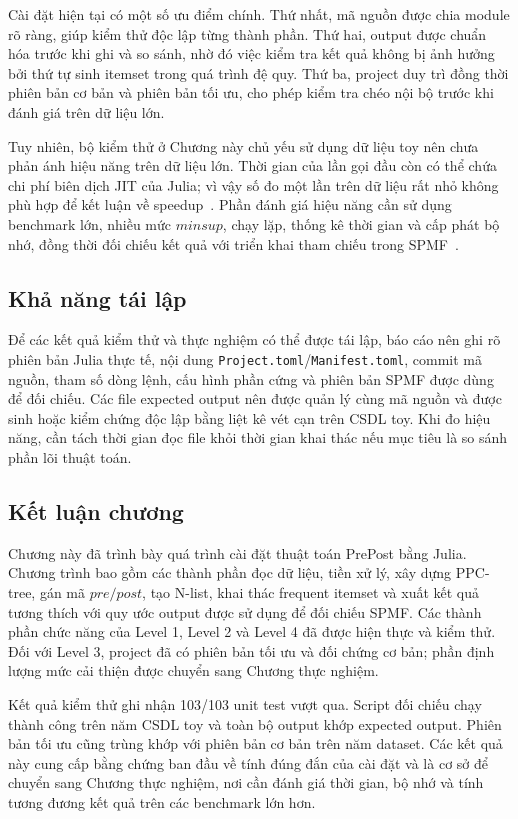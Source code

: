 Cài đặt hiện tại có một số ưu điểm chính. Thứ nhất, mã nguồn được chia module rõ ràng, giúp kiểm thử độc lập từng thành phần. Thứ hai, output được chuẩn hóa trước khi ghi và so sánh, nhờ đó việc kiểm tra kết quả không bị ảnh hưởng bởi thứ tự sinh itemset trong quá trình đệ quy. Thứ ba, project duy trì đồng thời phiên bản cơ bản và phiên bản tối ưu, cho phép kiểm tra chéo nội bộ trước khi đánh giá trên dữ liệu lớn.

Tuy nhiên, bộ kiểm thử ở Chương này chủ yếu sử dụng dữ liệu toy nên chưa
phản ánh hiệu năng trên dữ liệu lớn. Thời gian của lần gọi đầu còn có thể chứa
chi phí biên dịch JIT của Julia; vì vậy số đo một lần trên dữ liệu rất nhỏ không
phù hợp để kết luận về speedup~\cite{bezanson2017julia}. Phần đánh giá hiệu
năng cần sử dụng benchmark lớn, nhiều mức $\mathit{minsup}$, chạy lặp, thống kê
thời gian và cấp phát bộ nhớ, đồng thời đối chiếu kết quả với triển khai tham
chiếu trong SPMF~\cite{fournier2014spmf,spmfwebsite}.

\subsection{Khả năng tái lập}
\label{subsec:implementation-reproducibility}

Để các kết quả kiểm thử và thực nghiệm có thể được tái lập, báo cáo nên ghi rõ
phiên bản Julia thực tế, nội dung \texttt{Project.toml}/\texttt{Manifest.toml},
commit mã nguồn, tham số dòng lệnh, cấu hình phần cứng và phiên bản SPMF được
dùng để đối chiếu. Các file expected output nên được quản lý cùng mã nguồn và
được sinh hoặc kiểm chứng độc lập bằng liệt kê vét cạn trên CSDL toy. Khi đo
hiệu năng, cần tách thời gian đọc file khỏi thời gian khai thác nếu mục tiêu là
so sánh phần lõi thuật toán.

\subsection{Kết luận chương}
\label{subsec:implementation-conclusion}

Chương này đã trình bày quá trình cài đặt thuật toán PrePost bằng Julia.
Chương trình bao gồm các thành phần đọc dữ liệu, tiền xử lý, xây dựng PPC-tree,
gán mã $pre/post$, tạo N-list, khai thác frequent itemset và xuất kết quả tương
thích với quy ước output được sử dụng để đối chiếu SPMF. Các thành phần chức
năng của Level 1, Level 2 và Level 4 đã được hiện thực và kiểm thử. Đối với
Level 3, project đã có phiên bản tối ưu và đối chứng cơ bản; phần định lượng mức
cải thiện được chuyển sang Chương thực nghiệm.

Kết quả kiểm thử ghi nhận 103/103 unit test vượt qua. Script đối chiếu chạy
thành công trên năm CSDL toy và toàn bộ output khớp expected output. Phiên bản
tối ưu cũng trùng khớp với phiên bản cơ bản trên năm dataset. Các kết quả này
cung cấp bằng chứng ban đầu về tính đúng đắn của cài đặt và là cơ sở để chuyển
sang Chương thực nghiệm, nơi cần đánh giá thời gian, bộ nhớ và tính tương đương
kết quả trên các benchmark lớn hơn.
